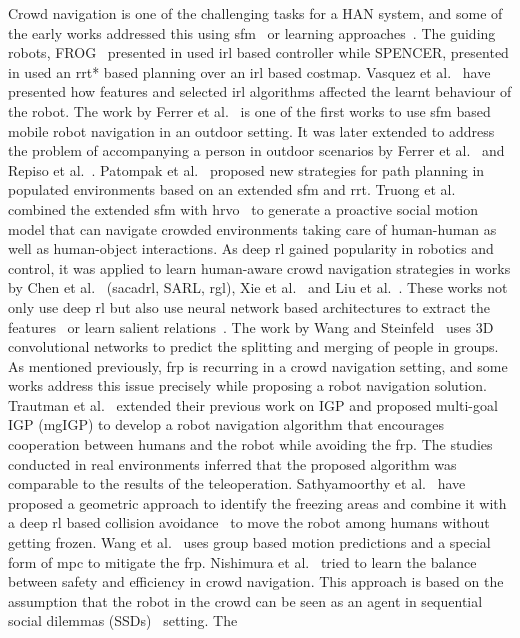 Crowd navigation is one of the challenging tasks for a HAN system, and some of the early works addressed this using \acrshort{sfm}~\cite{ferrer2013robot,ferrer2017robot, patompak2016mobile} or learning approaches~\cite{perez2014robot, vasquez2014inverse, triebel2016spencer, luber2012socially}. The guiding robots, FROG~\cite{idmfrog} presented in \cite{perez2014robot} used \acrshort{irl} based controller while SPENCER, presented in \cite{triebel2016spencer} used an \acrshort{rrt}* based planning over an \acrshort{irl} based costmap. Vasquez et al.~\cite{vasquez2014inverse} have presented how features and selected \acrshort{irl} algorithms affected the learnt behaviour of the robot. The work by Ferrer et al.~\cite{ferrer2013robot} is one of the first works to use \acrshort{sfm} based mobile robot navigation in an outdoor setting. It was later extended to address the problem of accompanying a person in outdoor scenarios by Ferrer et al.~\cite{ferrer2017robot} and Repiso et al.~\cite{repiso2017line}. Patompak et al.~\cite{patompak2016mobile} proposed new strategies for path planning in populated environments based on an extended \acrshort{sfm} and \acrshort{rrt}. Truong et al.~\cite{truong2017toward} combined the extended \acrshort{sfm} with \acrshort{hrvo}~\cite{snape2011hybrid} to generate a proactive social motion model that can navigate crowded environments taking care of human-human as well as human-object interactions. As deep \acrfull{rl} gained popularity in robotics and control, it was applied to learn human-aware crowd navigation strategies in works by Chen et al.~\cite{chen2017socially, chen2019crowd, chen2020relational} (\acrshort{sacadrl}, SARL, \acrshort{rgl}), Xie et al.~\cite{xie2021towards} and Liu et al.~\cite{liu2020robot}. These works not only use deep \acrshort{rl} but also use neural network based architectures to extract the features~\cite{liu2020robot} or learn salient relations~\cite{chen2020relational}. The work by Wang and Steinfeld~\cite{wang2020group} uses 3D convolutional networks to predict the splitting and merging of people in groups. As mentioned previously, \acrshort{frp} is recurring in a crowd navigation setting, and some works address this issue precisely while proposing a robot navigation solution. Trautman et al.~\cite{trautman2015robot} extended their previous work on IGP and proposed multi-goal IGP (mgIGP) to develop a robot navigation algorithm that encourages cooperation between humans and the robot while avoiding the \acrshort{frp}. The studies conducted in real environments inferred that the proposed algorithm was comparable to the results of the teleoperation. Sathyamoorthy et al.~\cite{sathyamoorthy2020frozone} have proposed a geometric approach to identify the freezing areas and combine it with a deep \acrshort{rl} based collision avoidance~\cite{long2018towards} to move the robot among humans without getting frozen. Wang et al.~\cite{wang2022group} uses group based motion predictions and a special form of \acrshort{mpc} to mitigate the \acrshort{frp}. Nishimura et al.~\cite{nishimura2020l2b} tried to learn the balance between safety and efficiency in crowd navigation. This approach is based on the assumption that the robot in the crowd can be seen as an agent in sequential social dilemmas (SSDs)~\cite{leibo2017multi} setting. The 